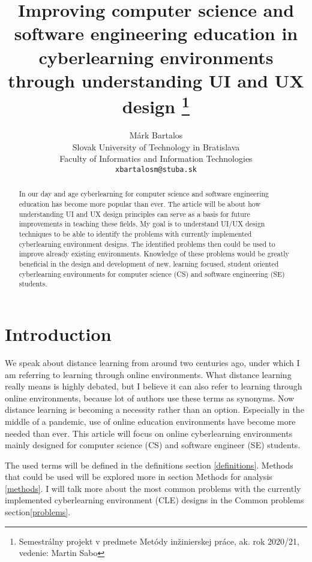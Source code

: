 \documentclass[10pt,twoside,english,a4paper]{article}
\title{Improving computer science and software 
engineering education in cyberlearning 
environments through understanding UI and UX design
\thanks{Semestrálny projekt v predmete Metódy inžinierskej práce,
 ak. rok 2020/21, vedenie: Martin Sabo}}
\author{Márk Bartalos \\[2pt]
        \small{Slovak University of Technology in Bratislava}\\
        \small{Faculty of Informatics and Information Technologies}\\
        \small{\texttt{xbartalosm@stuba.sk}}
}
\begin{document}
\maketitle

\begin{abstract}
    In our day and age cyberlearning for computer science and software engineering education has become more popular than ever. 
The article will be about how understanding UI and UX design principles can serve as a basis for future improvements in teaching
these fields. My goal is to understand UI/UX design techniques to be able to identify the problems with currently 
implemented cyberlearning environment designs. The identified problems then could be used to improve already existing environments.
Knowledge of these problems would be greatly beneficial in the design and development of new, learning focused, student 
oriented cyberlearning environments for computer science (CS) and software engineering (SE) students.
\end{abstract}



\section{Introduction}
We speak about distance learning from around two centuries ago\cite{moore_2011_elearning}, under which
I am referring to learning through online environments. What distance learning really means is highly debated\cite{moore_2011_elearning},
but I believe it can also refer to learning through online environments, because lot of authors use these terms as
synonyms\cite{distance_definition}\cite{moore_2011_elearning}. 
Now distance learning is becoming a necessity rather than an option. Especially in the middle of a pandemic, use of online 
education environments have become more needed than ever. This article will focus on online cyberlearning environments 
mainly designed for computer science (CS) and software engineer (SE) students.


The used terms will be defined in the definitions section \ref{definitions}.
Methods that could be used will be explored more in section Methods for analysis \ref{methods}.
I will talk more about the most common problems with the currently implemented cyberlearning environment (CLE)
designs in the Common problems section\ref{problems}.
\end{document}
